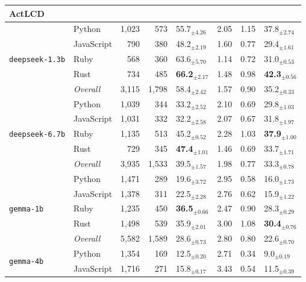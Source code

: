 \begin{longtable}{@{}llrrp{0.72cm}rrp{0.72cm}@{}}
  \midrule[1.2pt]
  \multicolumn{8}{l}{\textbf{\small ActLCD}} \\
  \midrule
      \multirow{5}{*}{\texttt{deepseek-1.3b}} & Python & 1,023 & 573 & 55.7$_{\pm 4.26}$ & 2.05 & 1.15 & 37.8$_{\pm 2.74}$ \\
       & JavaScript & 790 & 380 & 48.2$_{\pm 2.19}$ & 1.60 & 0.77 & 29.4$_{\pm 1.61}$ \\
       & Ruby & 568 & 360 & 63.6$_{\pm 5.70}$ & 1.14 & 0.72 & 31.0$_{\pm 0.53}$ \\
       & Rust & 734 & 485 & \textbf{66.2$_{\pm 2.17}$} & 1.48 & 0.98 & \textbf{42.3$_{\pm 0.56}$} \\ \cmidrule(lr){2-8}
      & \textit{Overall} & 3,115 & 1,798 & 58.4$_{\pm 2.42}$ & 1.57 & 0.90 & 35.2$_{\pm 0.33}$ \\
    \midrule
      \multirow{5}{*}{\texttt{deepseek-6.7b}} & Python & 1,039 & 344 & 33.2$_{\pm 2.52}$ & 2.10 & 0.69 & 29.8$_{\pm 1.03}$ \\
       & JavaScript & 1,031 & 332 & 32.2$_{\pm 2.58}$ & 2.07 & 0.67 & 31.8$_{\pm 1.97}$ \\
       & Ruby & 1,135 & 513 & 45.2$_{\pm 0.52}$ & 2.28 & 1.03 & \textbf{37.9$_{\pm 1.00}$} \\
       & Rust & 729 & 345 & \textbf{47.4$_{\pm 1.01}$} & 1.46 & 0.69 & 33.7$_{\pm 1.71}$ \\ \cmidrule(lr){2-8}
      & \textit{Overall} & 3,935 & 1,533 & 39.5$_{\pm 1.57}$ & 1.98 & 0.77 & 33.3$_{\pm 0.78}$ \\
    \midrule
      \multirow{5}{*}{\texttt{gemma-1b}} & Python & 1,471 & 289 & 19.6$_{\pm 3.72}$ & 2.95 & 0.58 & 16.0$_{\pm 1.73}$ \\
       & JavaScript & 1,378 & 311 & 22.5$_{\pm 2.28}$ & 2.76 & 0.62 & 15.9$_{\pm 1.22}$ \\
       & Ruby & 1,235 & 450 & \textbf{36.5$_{\pm 0.66}$} & 2.47 & 0.90 & 28.3$_{\pm 0.29}$ \\
       & Rust & 1,498 & 539 & 35.9$_{\pm 2.01}$ & 3.00 & 1.08 & \textbf{30.4$_{\pm 0.76}$} \\ \cmidrule(lr){2-8}
      & \textit{Overall} & 5,582 & 1,589 & 28.6$_{\pm 0.73}$ & 2.80 & 0.80 & 22.6$_{\pm 0.70}$ \\
    \midrule
      \multirow{5}{*}{\texttt{gemma-4b}} & Python & 1,354 & 169 & 12.5$_{\pm 0.20}$ & 2.71 & 0.34 & 9.0$_{\pm 0.19}$ \\
       & JavaScript & 1,716 & 271 & 15.8$_{\pm 0.17}$ & 3.43 & 0.54 & 11.5$_{\pm 0.39}$ \\

\end{longtable}
